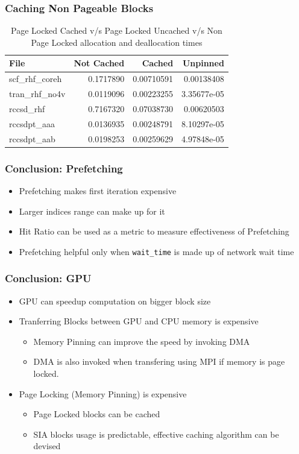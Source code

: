 \documentclass{beamer}
\begin{document}
\begin{frame}[fragile]
  \frametitle{Caching Non Pageable Blocks}
  \begin{table}[h]
    \centering
    \begin{tabular}{l<{\onslide<2->} | r<{\onslide<3->} | r<{\onslide<4->} | r<{\onslide}}
      \hline
      File            & Not Cached & Cached     & Unpinned    \\
      \hline
      scf\_rhf\_coreh & 0.1717890  & 0.00710591 & 0.00138408  \\
      tran\_rhf\_no4v & 0.0119096  & 0.00223255 & 3.35677e-05 \\
      rccsd\_rhf      & 0.7167320  & 0.07038730 & 0.00620503  \\
      rccsdpt\_aaa    & 0.0136935  & 0.00248791 & 8.10297e-05 \\
      rccsdpt\_aab    & 0.0198253  & 0.00259629 & 4.97848e-05 \\
      \hline
    \end{tabular}
    \caption{Page Locked Cached v/s Page Locked Uncached v/s Non Page Locked allocation
      and deallocation times}
  \end{table}
\end{frame}

\begin{frame}[]
  \frametitle{Conclusion: Prefetching}
  \begin{itemize}
    \pause
  \item Prefetching makes first iteration expensive
    \pause
  \item Larger indices range can make up for it
    \pause
  \item Hit Ratio can be used as a metric to measure effectiveness of Prefetching
    \pause
  \item Prefetching helpful only when \texttt{wait\_time} is made up of network wait
    time
  \end{itemize}
\end{frame}

\begin{frame}[fragile]
  \frametitle{Conclusion: GPU}
  \begin{itemize}
    \pause
  \item GPU can speedup computation on bigger block size
    \pause
  \item Tranferring Blocks between GPU and CPU memory is expensive
    \begin{itemize}
      \pause
    \item Memory Pinning can improve the speed by invoking DMA
      \pause
      \item DMA is also invoked when transfering using MPI if memory is page locked.
    \end{itemize}
    \pause
  \item Page Locking (Memory Pinning) is expensive
    \begin{itemize}
      \pause
    \item Page Locked blocks can be cached
      \pause
    \item SIA blocks usage is predictable, effective caching algorithm can be devised
    \end{itemize}
  \end{itemize}
\end{frame}
\end{document}
